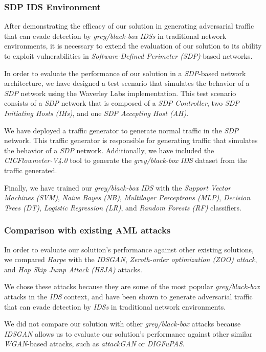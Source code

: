 \subsubsection{SDP IDS Environment}
After demonstrating the efficacy of our solution in generating adversarial traffic that can evade detection by
\textit{grey/black-box} \textit{IDSs} in traditional network environments, it is necessary to extend the evaluation of
our solution to its ability to exploit vulnerabilities in \textit{Software-Defined Perimeter (SDP)}-based networks.

In order to evaluate the performance of our solution in a \textit{SDP}-based network architecture, we have designed a
test scenario that simulates the behavior of a \textit{SDP} network using the Waverley Labs implementation.
This test scenario consists of a \textit{SDP} network that is composed of a \textit{SDP Controller}, two
\textit{SDP Initiating Hosts (IHs)}, and one \textit{SDP Accepting Host (AH)}.

We have deployed a traffic generator to generate normal traffic in the \textit{SDP} network.
This traffic generator is responsible for generating traffic that simulates the behavior of a \textit{SDP} network.
Additionally, we have included the \textit{CICFlowmeter-V4.0} tool to generate the \textit{grey/black-box} \textit{IDS}
dataset from the traffic generated.

Finally, we have trained our \textit{grey/black-box} \textit{IDS} with the \textit{Support Vector Machines (SVM)},
\textit{Naive Bayes (NB)}, \textit{Multilayer Perceptrons (MLP)}, \textit{Decision Trees (DT)},
\textit{Logistic Regression (LR)}, and \textit{Random Forests (RF)} classifiers.


\subsubsection{Comparison with existing AML attacks}
In order to evaluate our solution's performance against other existing solutions, we compared \textit{Harpe} with the
\textit{IDSGAN}, \textit{Zeroth-order optimization (ZOO) attack}, and \textit{Hop Skip Jump Attack (HSJA)} attacks.

We chose these attacks because they are some of the most popular \textit{grey/black-box} attacks in the \textit{IDS}
context, and have been shown to generate adversarial traffic that can evade detection by \textit{IDSs} in traditional
network environments.

We did not compare our solution with other \textit{grey/black-box} attacks because \textit{IDSGAN} allows us to
evaluate our solution's performance against other similar \textit{WGAN}-based attacks,
such as \textit{attackGAN} or \textit{DIGFuPAS}.

